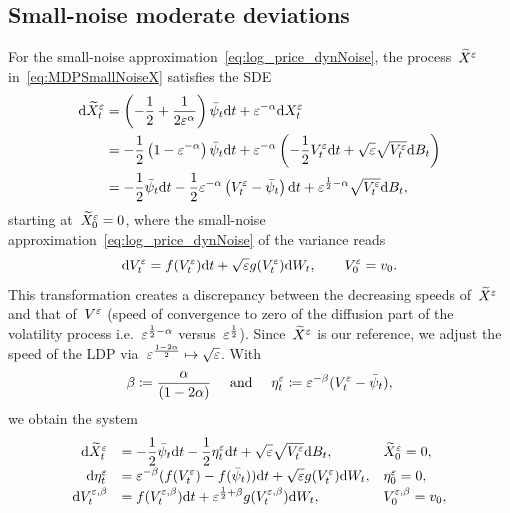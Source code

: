 \subsection{Small-noise moderate deviations}\label{sec:SmallNoiseMDP}
For the small-noise approximation~\eqref{eq:log_price_dynNoise}, the process~$\widetilde{X}^\varepsilon$ in~\eqref{eq:MDPSmallNoiseX} satisfies the SDE
\begin{align*}
\mathrm{d} \widetilde{X}^\varepsilon_t
 & = \displaystyle\left(-\frac{1}{2} + \frac{1}{2\varepsilon^{\alpha}}\right)\bar\psi_t\mathrm{d} t
+ \varepsilon^{-\alpha}\mathrm{d} X^{\varepsilon}_t\\
 & = \displaystyle-\frac{1}{2}\left(1 - \varepsilon^{-\alpha}\right)\bar\psi_t\mathrm{d} t
+ \varepsilon^{-\alpha}\left(-\frac{1}{2}V_t^\varepsilon \mathrm{d} t + \sqrt{\varepsilon}\sqrt{V_t^\varepsilon} \mathrm{d} B_t\right)\\
 & = \displaystyle
 -\frac{1}{2}\bar\psi_t\mathrm{d} t - \frac{1}{2}\varepsilon^{-\alpha}\left( V_t^\varepsilon - \bar\psi_t\right) \mathrm{d} t + 
\varepsilon^{\frac{1}{2}-\alpha}\sqrt{V_t^\varepsilon} \mathrm{d} B_t,
\end{align*}
starting at~$\widetilde{X}^{\varepsilon}_0 = 0$, where the small-noise approximation~\eqref{eq:log_price_dynNoise} of the variance reads
$$
\mathrm{d} V_t^{\varepsilon} = \displaystyle  f(V_t^{\varepsilon})\mathrm{d} t + \sqrt{\varepsilon} g(V_t^{\varepsilon})\mathrm{d} W_t, 
\qquad V_0^{\varepsilon} = v_0.
$$
This transformation creates a discrepancy between the decreasing speeds of~$\widetilde{X}^{\varepsilon}$ and that of~$V^{\varepsilon}$ (speed of convergence to zero of the diffusion part of the volatility process i.e.~$\varepsilon^{\frac{1}{2} - \alpha}$ versus~$\varepsilon^{\frac{1}{2}}$). Since~$\widetilde{X}^{\varepsilon}$ is our reference, %
we adjust the speed of the LDP via~$\varepsilon^{\frac{1 - 2\alpha}{2}}\mapsto \sqrt{\varepsilon}$. With 
\[\beta \coloneqq \frac{\alpha}{(1 - 2\alpha)} \quad \textup{ and } \quad \eta^\varepsilon_t \coloneqq \varepsilon^{-\beta}(V_t^\varepsilon - \bar\psi_t),\]
we obtain the system
\begin{equation}\label{eq:eps_MDP__eta_V}
\def\arraystretch{1.25}
\begin{array}{rll}
\D \widetilde{X}^\eps_t & = \displaystyle -\frac{1}{2}\bar\psi_t \D t -\frac{1}{2}\eta^\eps_t \D t + \sqrt{\eps}\sqrt{V_t^\eps} \D B_t, 
& \widetilde{X}_0^\eps = 0,\\
\D \eta_{t}^\eps & = \displaystyle \eps^{-\beta}(f(V_t^\eps)-f(\bar\psi_t))\D t + \sqrt{\eps}g(V_t^\eps)\D W_t, & \eta_{0}^\eps = 0,\\
\D V_t^{\eps,\beta} & = \displaystyle  f(V_t^{\eps,\beta})\D t + \eps^{\frac{1}{2} + \beta}g(V_t^{\eps,\beta})\D W_t, & V_0^{\eps,\beta} = v_0,
\end{array}
\end{equation}

